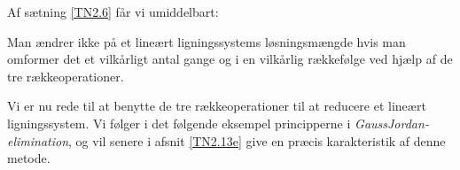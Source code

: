 \begin{bevis}



\end{bevis}

Af  sætning \ref{TN2.6} får vi umiddelbart:

\begin{corollary}
Man ændrer ikke på et lineært ligningssystems løsningsmængde hvis man omformer det et vilkårligt antal gange og i en vilkårlig rækkefølge ved hjælp af de tre rækkeoperationer.
\end{corollary}

Vi er nu rede til at benytte de tre rækkeoperationer til at reducere et lineært lig\-nings\-sy\-stem. Vi følger i det følgende eksempel principperne i \textit{GaussJordan-elimination}, og vil senere i afsnit \ref{TN2.13e} give en præcis karakteristik af denne metode.

